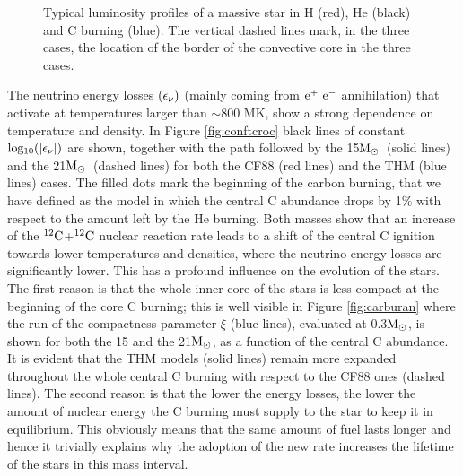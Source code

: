 \documentclass{aastex631}
\newcommand{\msun}{$\rm M_\odot$}
\newcommand\nuk[2]{$\rm ^{\rm #2} #1$}
\begin{document}
\begin{figure}[ht!]
\caption{Typical luminosity profiles of a massive star in H (red), He (black) and C burning (blue). The vertical dashed lines mark, in the three cases, the location of the border of the convective core in the three cases. \label{fig:lumi}}
\end{figure}

The neutrino energy losses $\rm(\epsilon_\nu)$ (mainly coming from $\rm e^{+}~e^{-}$ annihilation) that activate at temperatures larger than $\sim800$ MK, show a strong dependence on temperature and density. In Figure \ref{fig:conftcroc} black lines of constant $\rm log_{10}(\left|\epsilon_\nu\right|)$ are shown, together with the path followed by the 15\msun~(solid lines) and the 21\msun~(dashed lines) for both the CF88 (red lines) and the THM (blue lines) cases. The filled dots mark the beginning of the carbon burning, that we have defined as the model in which the central C abundance drops by 1\% with respect to the amount left by the He burning. Both masses show that an increase of the \nuk{C}{12}+\nuk{C}{12} nuclear reaction rate leads to a shift of the central C ignition towards lower temperatures and densities, where the neutrino energy losses are significantly lower. This has a profound influence on the evolution of the stars. The first reason is that the whole inner core of the stars is less compact at the beginning of the core C burning; this is well visible in Figure \ref{fig:carburan} where the run of the compactness parameter $\xi$ (blue lines), evaluated at 0.3\msun, is shown for both the 15 and the 21\msun, as a function of the central C abundance. It is evident that the THM models (solid lines) remain more expanded throughout the whole central C burning with respect to the CF88 ones (dashed lines). The second reason is that the lower the energy losses, the lower the amount of nuclear energy the C burning must supply to the star to keep it in equilibrium. This obviously means that the same amount of fuel lasts longer and hence it trivially explains why the adoption of the new rate increases the lifetime of the stars in this mass interval. 
\end{document}
